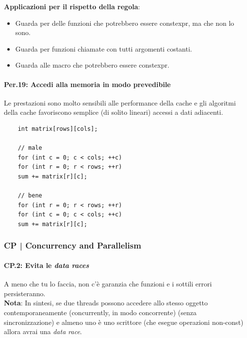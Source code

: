 \textsf{\small \textbf{Applicazioni per il rispetto della regola}: }

\begin{itemize}
	\item \textsf{\small Guarda per delle funzioni che potrebbero essere constexpr, ma che non lo sono.}
	\item \textsf{\small Guarda per funzioni chiamate con tutti argomenti costanti.}
	\item \textsf{\small Guarda alle macro che potrebbero essere constexpr.}
\end{itemize}

\paragraph{Per.19: Accedi alla memoria in modo prevedibile}

\label{Per_19}

\textsf{\small Le prestazioni sono molto sensibili alle performance della cache e gli algoritmi della cache favoriscono semplice (di solito lineari) accessi a dati adiacenti.} \\

\begin{lstlisting}
	int matrix[rows][cols];
	
	// male
	for (int c = 0; c < cols; ++c)
	for (int r = 0; r < rows; ++r)
	sum += matrix[r][c];
	
	// bene
	for (int r = 0; r < rows; ++r)
	for (int c = 0; c < cols; ++c)
	sum += matrix[r][c];
\end{lstlisting}


\newpage

\subsubsection{CP | Concurrency and Parallelism}

\paragraph{CP.2: Evita le \emph{data races}}

\textsf{\small A meno che tu lo faccia, non c'è garanzia che funzioni e i sottili errori persisteranno.} \\

\textsf{\small \textbf{Nota}: In sintesi, se due threads possono accedere allo stesso oggetto contemporaneamente (concurrently, in modo concorrente) (senza sincronizzazione) e almeno uno è uno scrittore (che esegue operazioni non-const) allora avrai una \emph{data race}. } \\

